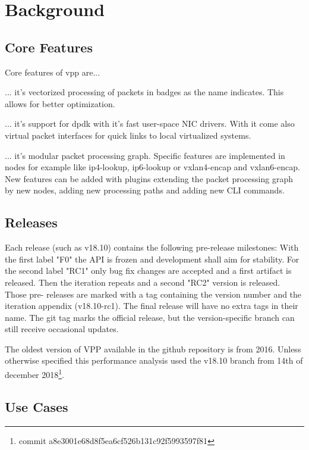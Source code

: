 
\section{Background}

\subsection{Core Features}


Core features of \Ac{vpp} are... 

... it's vectorized processing of packets in badges as the name
indicates. This allows for better optimization.

... it's support for \Ac{dpdk} with it's fast user-space NIC drivers.
With it come also virtual packet interfaces for quick links to local
virtualized systems.

... it's modular packet processing graph. Specific features are
implemented in nodes for example like ip4-lookup, ip6-lookup or
vxlan4-encap and vxlan6-encap. New features can be added with plugins
extending the packet processing graph by new nodes, adding new
processing paths and adding new CLI commands.


\subsection{Releases}


Each release (such as v18.10) contains the following pre-release
milestones:  With the first label "F0" the API is frozen and
development shall aim for stability. For the second label "RC1" only
bug fix changes are accepted and a first artifact is released. Then
the iteration repeats and a second "RC2" version is released. Those
pre- releases are marked with a tag containing the version number and
the iteration appendix (v18.10-rc1). The final release will have no
extra tags in their name. The git tag marks the official release, but
the version-specific branch can still receive occasional updates.
\cite{vppwiki:releases}

The oldest version of VPP available in the github repository is from
2016. Unless otherwise specified this performance analysis used the
v18.10 branch from 14th of december 2018\footnote{commit
a8e3001e68d8f5ea6cf526b131c92f5993597f81}.


\subsection{Use Cases}

